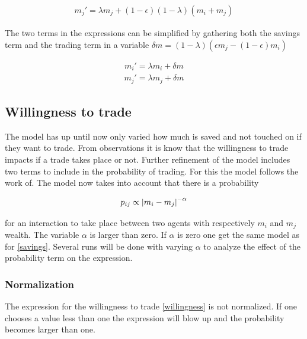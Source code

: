 \begin{align}
	 m_j'=\lambda m_j+(1-\epsilon)(1-\lambda)(m_i+m_j) \label{savingsterm2}
 \end{align}
 
 The two terms in the expressions can be simplified by gathering both the savings term and the trading term in a variable $\delta m=(1-\lambda)(\epsilon m_j-(1-\epsilon)m_i)$
 
 \begin{align*}
	 m_i'=\lambda m_i+\delta m
 \end{align*}
 \begin{align*}
	 m_j'=\lambda m_j+\delta m
 \end{align*}

\subsection{Willingness to trade}

The model has up until now only varied how much is saved and not touched on if they want to trade. From observations it is know that the willingness to trade impacts if a trade takes place or not. Further refinement of the model includes two terms to include in the probability of trading. For this the model follows the work of.\cite{goswami} The model now takes into account that there is a probability

\begin{align}
	p_{ij}\propto \abs{m_i-m_j}^{-\alpha}\label{eq:willingness}
\end{align}

for an interaction to take place between two agents with respectively $m_i$ and $m_j$ wealth. The variable $\alpha$ is larger than zero. If $\alpha$ is zero one get the same model as for \ref{savings}. Several runs will be done with varying $\alpha$ to analyze the effect of the probability term on the expression.

\subsubsection{Normalization}
\label{sec:normalization1}
The expression for the willingness to trade \ref{willingness} is not normalized. If one chooses a value less than one the expression will blow up and the probability becomes larger than one.\\


